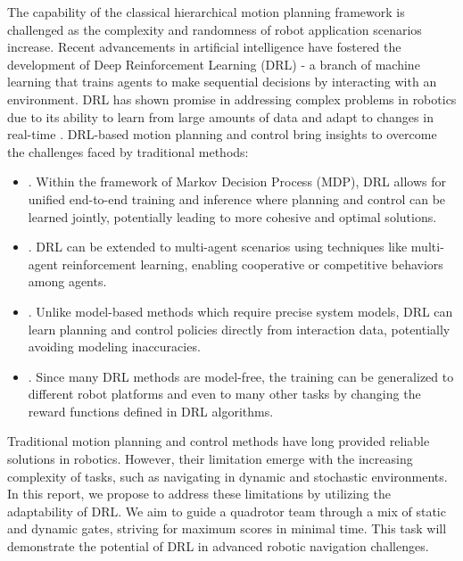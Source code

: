 \documentclass[letterpaper,journal,twoside]{IEEEtran}
\begin{document}
The capability of the 
classical hierarchical motion planning framework is 
challenged 
as the complexity and randomness of robot application 
scenarios increase. 
Recent advancements in artificial intelligence have fostered 
the development of Deep Reinforcement Learning (DRL) - a branch 
of machine learning that trains agents to make sequential 
decisions by interacting with an environment. DRL has shown 
promise in addressing complex problems in robotics 
due to its ability to learn from large 
amounts of data and adapt to changes in real-time
\cite{lee2020learning,hwangbo2017control,gu2017deep}.
DRL-based motion planning and control bring insights to 
overcome the challenges faced by traditional methods: 
\begin{itemize}
  \item {}. Within the framework 
  of Markov Decision Process (MDP), DRL allows for unified end-to-end 
  training and inference where planning and control can be 
  learned 
  jointly, potentially leading to more cohesive and optimal 
  solutions.
  \item {}.  DRL can be 
  extended to multi-agent scenarios using techniques like 
  multi-agent reinforcement learning, enabling cooperative or 
  competitive behaviors among agents.
  \item {}. Unlike model-based methods which 
  require precise system models, DRL can learn planning and  
  control policies directly from interaction data, potentially  
  avoiding modeling inaccuracies.
  \item {}. Since many DRL methods are 
  model-free, the training can be generalized to different 
  robot platforms and even to many other tasks by changing 
  the reward functions defined in DRL algorithms.
\end{itemize}


Traditional motion planning and control methods have long 
provided 
reliable solutions in robotics. 
However, their limitation emerge with the increasing complexity of tasks, 
such as 
navigating in dynamic and stochastic environments.
In this report, we propose to address these limitations
by utilizing the 
adaptability of DRL.  
We aim to guide a quadrotor team through a mix of static 
and dynamic gates, striving for maximum scores in minimal time. 
This task will demonstrate the potential of DRL in advanced 
robotic navigation challenges.
\end{document}
